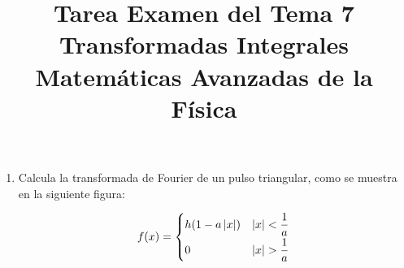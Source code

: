 
\author{}
\title{Tarea Examen del Tema 7  \\ \large{Transformadas Integrales\\ Matemáticas Avanzadas de la Física}} \vspace{-1.5\baselineskip}
\date{ }

\vspace{-4cm}
\renewcommand\labelenumii{\theenumi.{\arabic{enumii})}}
\maketitle
\fontsize{14}{14}\selectfont
\begin{enumerate}
\item Calcula la transformada de Fourier de un pulso triangular, como se muestra en la siguiente figura:
\begin{figure}[H]
    \centering
    
\end{figure}
\begin{align*}
f(x) = \begin{cases}
h(1 - a \, \abs{x}) & \abs{x} < \dfrac{1}{a} \\[0.5em]
0 & \abs{x} > \dfrac{1}{a}
\end{cases}
\end{align*}
\end{enumerate}
